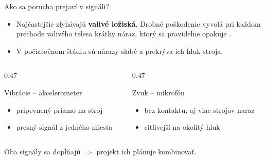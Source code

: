 \documentclass[aspectratio=169,11pt]{beamer}
\begin{document}
\begin{frame}{Ako sa porucha prejaví v signáli?}
  \begin{itemize}
    \item Najčastejšie zlyhávajú \textbf{valivé ložiská}. Drobné poškodenie vyvolá pri každom prechode valivého telesa krátky náraz, ktorý sa pravidelne opakuje \cite{randall}.
    \item V počiatočnom štádiu sú nárazy slabé a prekrýva ich hluk stroja.
  \end{itemize}
  \medskip
  \begin{columns}[T]
    \begin{column}{0.47\textwidth}
      \begin{block}{Vibrácie -- akcelerometer}
        \begin{itemize}
          \item pripevnený priamo na stroj
          \item presný signál z jedného miesta
        \end{itemize}
      \end{block}
    \end{column}
    \begin{column}{0.47\textwidth}
      \begin{block}{Zvuk -- mikrofón}
        \begin{itemize}
          \item bez kontaktu, aj viac strojov naraz
          \item citlivejší na okolitý hluk \cite{dcase}
        \end{itemize}
      \end{block}
    \end{column}
  \end{columns}
  \medskip
  \centering\alert{Oba signály sa dopĺňajú $\Rightarrow$ projekt ich plánuje kombinovať.}
\end{frame}
\end{document}

